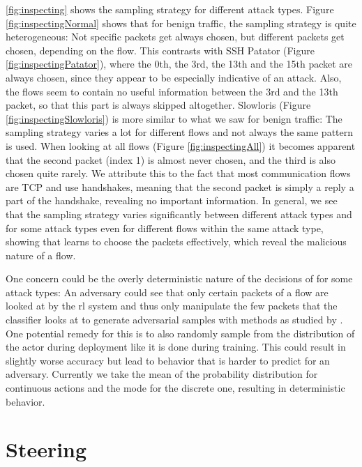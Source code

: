 \documentclass[conference]{IEEEtran}
\begin{document}
\autoref{fig:inspecting} shows the sampling strategy for different attack types. Figure \ref{fig:inspectingNormal} shows that for benign traffic, the sampling strategy is quite heterogeneous: Not specific packets get always chosen, but different packets get chosen, depending on the flow. This contrasts with SSH Patator (Figure \ref{fig:inspectingPatator}), where the 0th, the 3rd, the 13th and the 15th packet are always chosen, since they appear to be especially indicative of an attack. Also, the flows seem to contain no useful information between the 3rd and the 13th packet, so that this part is always skipped altogether. Slowloris (Figure \ref{fig:inspectingSlowloris}) is more similar to what we saw for benign traffic: The sampling strategy varies a lot for different flows and not always the same pattern is used. When looking at all flows (Figure \ref{fig:inspectingAll}) it becomes apparent that the second packet (index 1) is almost never chosen, and the third is also chosen quite rarely. We attribute this to the fact that most communication flows are TCP and use handshakes, meaning that the second packet is simply a reply a part of the handshake, revealing no important information. In general, we see that the sampling strategy varies significantly between different attack types and for some attack types even for different flows within the same attack type, showing that \ours{} learns to choose the packets effectively, which reveal the malicious nature of a flow.

One concern could be the overly deterministic nature of the decisions of \ours{} for some attack types: An adversary could see that only certain packets of a flow are looked at by the \gls{rl} system and thus only manipulate the few packets that the classifier looks at to generate adversarial samples with methods as studied by \cite{hartl_explainability_2019}. One potential remedy for this is to also randomly sample from the distribution of the actor during deployment like it is done during training. This could result in slightly worse accuracy but lead to behavior that is harder to predict for an adversary. Currently we take the mean of the probability distribution for continuous actions and the mode for the discrete one, resulting in deterministic behavior.

\section{Steering}
\end{document}
